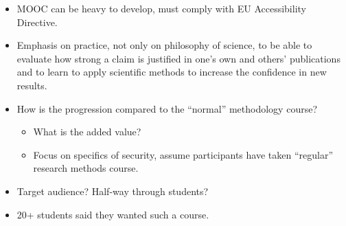 \begin{frame}
  \begin{itemize}
    \item MOOC can be heavy to develop, must comply with EU Accessibility 
      Directive.

    \item Emphasis on practice, not only on philosophy of science, to be able 
      to evaluate how strong a claim is justified in one's own and others' 
      publications and to learn to apply scientific methods to increase the 
      confidence in new results.

    \item How is the progression compared to the \enquote{normal} methodology  
      course?
      \begin{itemize}
        \item What is the added value?
        \item Focus on specifics of security, assume participants have taken 
          \enquote{regular} research methods course.
      \end{itemize}

    \item Target audience? Half-way through students?

    \item 20+ students said they wanted such a course.
  \end{itemize}
\end{frame}



\begin{frame}[allowframebreaks]
  \printbibliography
\end{frame}

